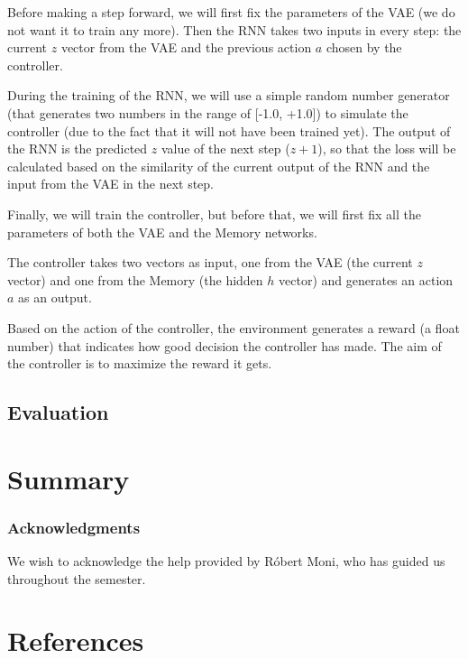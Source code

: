 \documentclass{article}
\begin{document}
Before making a step forward, we will first fix the parameters of the VAE (we do not want it to train any more). Then the RNN takes two inputs in every step: the current $z$ vector from the VAE and the previous action $a$ chosen by the controller.

During the training of the RNN, we will use a simple random number generator (that generates two numbers in the range of [-1.0, +1.0]) to simulate the controller (due to the fact that it will not have been trained yet). The output of the RNN is the predicted $z$ value of the next step ($z+1$), so that the loss will be calculated based on the similarity of the current output of the RNN and the input from the VAE in the next step.

Finally, we will train the controller, but before that, we will first fix all the parameters of both the VAE and the Memory networks.


The controller takes two vectors as input, one from the VAE (the current $z$ vector) and one from the Memory (the hidden $h$ vector) and generates an action $a$ as an output.

Based on the action of the controller, the environment generates a reward (a float number) that indicates how good decision the controller has made. The aim of the controller is to maximize the reward it gets.


\subsection{Evaluation}

\section{Summary}



\subsubsection*{Acknowledgments}

We wish to acknowledge the help provided by Róbert Moni, who has guided us throughout the semester.

\section*{References}


\small


\end{document}
